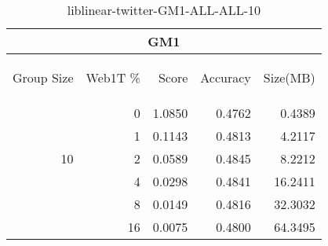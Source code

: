 \begin{center}
\begin{table}[htbp]
\begin{tabular}{ | r | r | r | r | r |}
\hline
\multicolumn{5}{|c|}{GM1}\\
\hline
\begin{sideways}Group Size\end{sideways} & \begin{sideways}Web1T \%\end{sideways} & \begin{sideways}Score\end{sideways} & \begin{sideways}Accuracy\end{sideways} & \begin{sideways}Size(MB)\end{sideways}\\
\hline
\multirow{5}{*}{10}
 & 0 & 1.0850 & 0.4762 & 0.4389\\ \cline{2-5}
 & 1 & 0.1143 & 0.4813 & 4.2117\\ \cline{2-5}
 & 2 & 0.0589 & 0.4845 & 8.2212\\ \cline{2-5}
 & 4 & 0.0298 & 0.4841 & 16.2411\\ \cline{2-5}
 & 8 & 0.0149 & 0.4816 & 32.3032\\ \cline{2-5}
 & 16 & 0.0075 & 0.4800 & 64.3495\\ \cline{2-5}
\hline
\end{tabular}
\caption{liblinear-twitter-GM1-ALL-ALL-10}
\label{table:liblinear-twitter-GM1-ALL-ALL-10}
\end{table}
\end{center}

